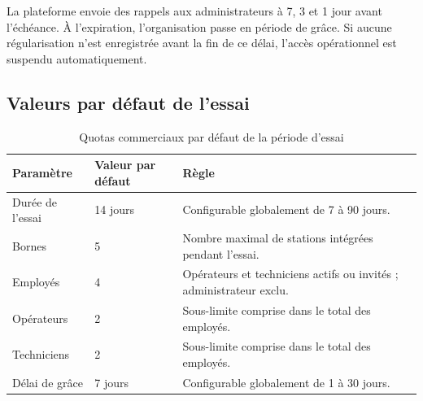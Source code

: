 La plateforme envoie des rappels aux administrateurs à 7, 3 et 1 jour avant
l'échéance. À l'expiration, l'organisation passe en période de grâce. Si aucune
régularisation n'est enregistrée avant la fin de ce délai, l'accès opérationnel
est suspendu automatiquement.


\subsection{Valeurs par défaut de l'essai}

\begin{table}[H]
  \centering
  \caption{Quotas commerciaux par défaut de la période d'essai}
  \label{tab:trial-defaults}
  \begin{tabularx}{\textwidth}{|Y|C{3.2cm}|Y|}
    \hline
    \textbf{Paramètre} & \textbf{Valeur par défaut} & \textbf{Règle} \\ \hline
    Durée de l'essai & 14 jours & Configurable globalement de 7 à 90 jours. \\ \hline
    Bornes & 5 & Nombre maximal de stations intégrées pendant l'essai. \\ \hline
    Employés & 4 & Opérateurs et techniciens actifs ou invités ; administrateur
    exclu. \\ \hline
    Opérateurs & 2 & Sous-limite comprise dans le total des employés. \\ \hline
    Techniciens & 2 & Sous-limite comprise dans le total des employés. \\ \hline
    Délai de grâce & 7 jours & Configurable globalement de 1 à 30 jours. \\ \hline
  \end{tabularx}
\end{table}


